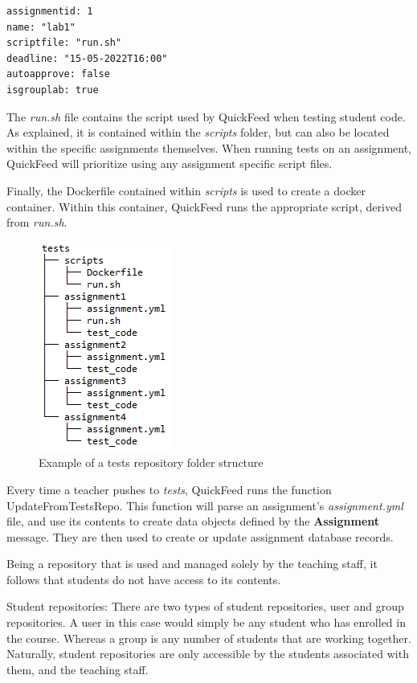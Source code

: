 \begin{lstlisting}[caption={Example contents of an \textit{assignment.yml} file}, numbers=none]
assignmentid: 1
name: "lab1"
scriptfile: "run.sh"
deadline: "15-05-2022T16:00"
autoapprove: false
isgrouplab: true
\end{lstlisting}

The \textit{run.sh} file contains the script used by QuickFeed when testing student code.
As explained, it is contained within the \textit{scripts} folder, but can also be located within the specific assignments themselves.
When running tests on an assignment, QuickFeed will prioritize using any assignment specific script files.

Finally, the Dockerfile contained within \textit{scripts} is used to create a docker container.
Within this container, QuickFeed runs the appropriate script, derived from \textit{run.sh}.

\begin{figure}[ht]
    \centering
    \includegraphics[scale=0.8]{photos/tests-repository-structure.PNG}
    \caption{Example of a tests repository folder structure}
    \label{fig:tests-repository-structure}
\end{figure}

Every time a teacher pushes to \textit{tests}, QuickFeed runs the function UpdateFromTestsRepo.
This function will parse an assignment's \textit{assignment.yml} file, and use its contents to create data objects defined by the \textbf{Assignment} message.
They are then used to create or update assignment database records.

Being a repository that is used and managed solely by the teaching staff, it follows that students do not have access to its contents.

Student repositories: There are two types of student repositories, user and group repositories.
A user in this case would simply be any student who has enrolled in the course.
Whereas a group is any number of students that are working together.
Naturally, student repositories are only accessible by the students associated with them, and the teaching staff.

